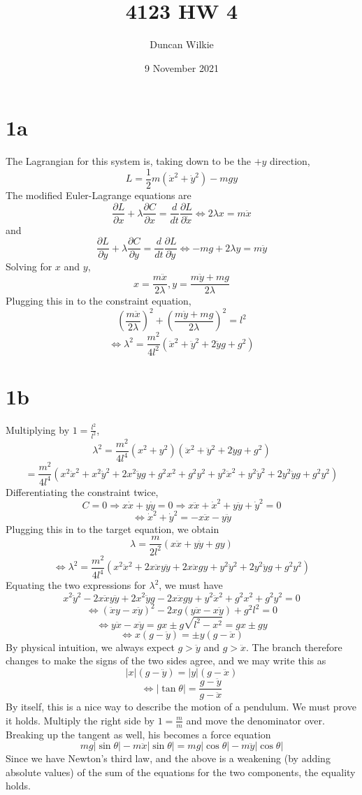 \documentclass{article}
\title{4123 HW 4}
\author{Duncan Wilkie}
\date{9 November 2021}
\begin{document}
\maketitle

\section*{1a}
The Lagrangian for this system is, taking down to be the $+y$ direction,
\[L=\frac{1}{2}m(\dot{x}^2+\dot{y}^2)-mgy\]
The modified Euler-Lagrange equations are
\[\frac{\partial L}{\partial x}+\lambda\frac{\partial C}{\partial x}=\frac{d}{dt}\frac{\partial L}{\partial \dot{x}}\Leftrightarrow 2\lambda x=m\ddot{x}\]
and
\[\frac{\partial L}{\partial y}+\lambda\frac{\partial C}{\partial y}=\frac{d}{dt}\frac{\partial L}{\partial\dot{y}}\Leftrightarrow -mg+2\lambda y = m\ddot{y}\]
Solving for $x$ and $y$,
\[x = \frac{m\ddot{x}}{2\lambda}, y = \frac{m\ddot{y}+mg}{2\lambda}\]
Plugging this in to the constraint equation,
\[\left( \frac{m\ddot{x}}{2\lambda} \right)^2+\left( \frac{m\ddot{y}+mg}{2\lambda} \right)^2=l^2\]
\[\Leftrightarrow \lambda^2=\frac{m^2}{4l^2}\left( \ddot{x}^2+\ddot{y}^2+2\ddot{y}g+g^2 \right)\]

\section*{1b}
Multiplying by $1=\frac{l^2}{l^2}$,
\[\lambda^2=\frac{m^2}{4l^4}\left( x^2+y^2 \right)\left( \ddot{x}^2+\ddot{y}^2+2\ddot{y}g+g^2 \right)\]
\[=\frac{m^2}{4l^4}\left( x^2\ddot{x}^2+x^2\ddot{y}^2+2x^2\ddot{y}g+g^2x^2+g^2y^2+y^2\ddot{x}^2+y^2\ddot{y}^2+2y^2\ddot{y}g+g^2y^2 \right)\]
Differentiating the constraint twice,
\[C=0\Rightarrow x\dot{x}+y\dot{y}=0\Rightarrow x\ddot{x}+\dot{x}^2+y\ddot{y}+\dot{y}^2=0\]
\[\Leftrightarrow \dot{x}^2+\dot{y}^2=-x\ddot{x}-y\ddot{y}\]
Plugging this in to the target equation, we obtain
\[\lambda = \frac{m}{2l^2}(x\ddot{x}+y\ddot{y}+gy)\]
\[\Leftrightarrow \lambda^2=\frac{m^2}{4l^4}\left( x^2\ddot{x}^2+2x\ddot{x}y\ddot{y}+2x\ddot{x}gy+y^2\ddot{y}^2+2y^2\ddot{y}g+g^2y^2 \right)\]
Equating the two expressions for $\lambda^2$, we must have
\[x^2\ddot{y}^2-2x\ddot{x}y\ddot{y}+2x^2\ddot{y}g-2x\ddot{x}gy+y^2\ddot{x}^2+g^2x^2+g^2y^2=0\]
\[\Leftrightarrow (\ddot{x}y-x\ddot{y})^2-2xg(y\ddot{x}-x\ddot{y})+g^2l^2=0\]
\[\Leftrightarrow y\ddot{x}-x\ddot{y}=gx\pm g\sqrt{l^2-x^2}=gx\pm gy\]
\[\Leftrightarrow x(g-\ddot{y})=\pm y(g-\ddot{x})\]
By physical intuition, we always expect $g > \ddot{y}$ and $g>\ddot{x}$. The branch therefore changes to make the signs of the two sides agree, and we may write this as
\[|x|(g-\ddot{y})=|y|(g-\ddot{x})\]
\[\Leftrightarrow |\tan\theta|=\frac{g-\ddot{y}}{g-\ddot{x}}\]
By itself, this is a nice way to describe the motion of a pendulum. We must prove it holds. Multiply the right side by $1=\frac{m}{m}$ and move the denominator over. Breaking up the tangent as well, his becomes a force equation
\[mg|\sin\theta|-m\ddot{x}|\sin\theta|=mg|\cos\theta|-m\ddot{y}|\cos\theta|\]
Since we have Newton's third law, and the above is a weakening (by adding absolute values) of the sum of the equations for the two components, the equality holds.
\end{document}
